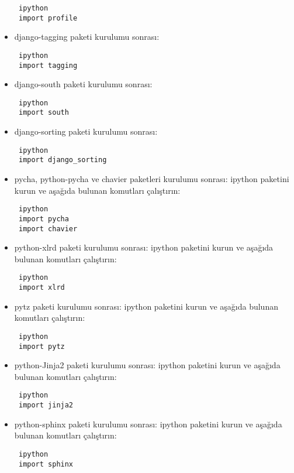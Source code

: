 \documentclass[a4paper,10pt]{article}
\begin{document}
\begin{itemize}
\begin{verbatim}
 ipython
 import profile
\end{verbatim}

\item django-tagging paketi kurulumu sonrası:
\begin{verbatim}
 ipython
 import tagging
\end{verbatim}

\item django-south paketi kurulumu sonrası:
\begin{verbatim}
 ipython
 import south
\end{verbatim}

\item django-sorting paketi kurulumu sonrası:

\begin{verbatim}
 ipython
 import django_sorting
\end{verbatim}

\item pycha, python-pycha ve chavier paketleri kurulumu sonrası:
ipython paketini kurun ve aşağıda bulunan komutları çalıştırın:
\begin{verbatim}
 ipython
 import pycha
 import chavier
\end{verbatim}

\item python-xlrd paketi kurulumu sonrası:
ipython paketini kurun ve aşağıda bulunan komutları çalıştırın:
\begin{verbatim}
 ipython
 import xlrd
\end{verbatim}

\item pytz paketi kurulumu sonrası:
ipython paketini kurun ve aşağıda bulunan komutları çalıştırın:
\begin{verbatim}
 ipython
 import pytz
\end{verbatim}

\item python-Jinja2 paketi kurulumu sonrası:
ipython paketini kurun ve aşağıda bulunan komutları çalıştırın:
\begin{verbatim}
 ipython
 import jinja2
\end{verbatim}

\item python-sphinx paketi kurulumu sonrası:
ipython paketini kurun ve aşağıda bulunan komutları çalıştırın:
\begin{verbatim}
 ipython
 import sphinx
\end{verbatim}



\end{itemize}
\end{document}
